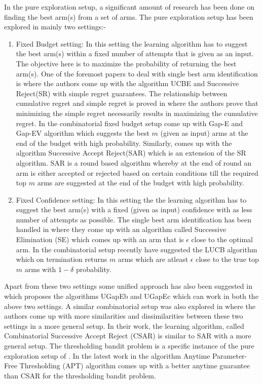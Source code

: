 	In the pure exploration setup, a significant amount of research has been done on finding the best arm(s) from a set of arms. The pure exploration setup has been explored in mainly two settings:-
\begin{enumerate}
\item Fixed Budget setting: In this setting the learning algorithm has to suggest the best arm(s) within a fixed number of attempts that is given as an input. The objective here is to maximize the probability of returning the best arm(s). One of the foremost papers to deal with single best arm identification is \cite{audibert2009exploration} where the authors come up with the algorithm UCBE and Successive Reject(SR) with simple regret guarantees. The relationship between cumulative regret and simple regret is proved in \cite{bubeck2011pure} where the authors prove that minimizing the simple regret necessarily results in maximizing the cumulative regret. In the combinatorial fixed budget setup \cite{gabillon2011multi} come up with Gap-E and Gap-EV algorithm which suggests the best $m$ (given as input) arms at the end of the budget with high probability. Similarly, \cite{bubeck2013multiple} comes up with the algorithm Successive Accept Reject(SAR) which is an extension of the SR algorithm. SAR is a round based algorithm whereby at the end of round an arm is either accepted or rejected based on certain conditions till the required top $m$ arms are suggested at the end of the budget with high probability. 
\item Fixed Confidence setting: In this setting the the learning algorithm has to suggest the best arm(s) with a fixed (given as input) confidence with as less number of attempts as possible. The single best arm identification has been handled in \cite{even2006action} where they come up with an algorithm called Successive Elimination (SE) which comes up with an arm that is $\epsilon$ close to the optimal arm. In the combinatorial setup recently \cite{kalyanakrishnan2012pac} have suggested the LUCB algorithm which on termination returns $m$ arms which are atleast $\epsilon$ close to the true top $m$ arms with $1-\delta$ probability.
\end{enumerate}	

	Apart from these two settings some unified approach has also been suggested in \cite{gabillon2012best} which proposes the algorithms UGapEb and UGapEc which can work in both the above two settings. A similar combinatorial setup was also explored in \cite{chen2014combinatorial} where the authors come up with more similarities and dissimilarities between these two settings in a more general setup. In their work, the learning algorithm, called Combinatorial Successive Accept Reject (CSAR) is similar to SAR with a more general setup. The thresholding bandit problem is a specific instance of the pure exploration setup of \cite{chen2014combinatorial}. In the latest work in \cite{locatelli2016optimal} the algorithm Anytime Parameter-Free Thresholding (APT) algorithm comes up with a better anytime guarantee than CSAR for the thresholding bandit problem.